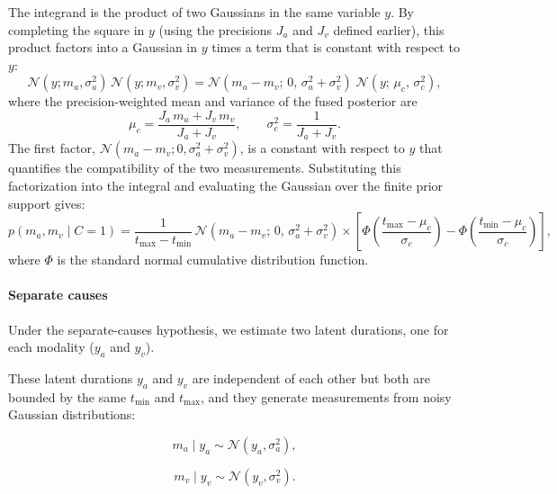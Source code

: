 \documentclass{jov}
\begin{document}
The integrand is the product of two Gaussians in the same variable $y$. By completing the square in $y$ (using the precisions $J_a$ and $J_v$ defined earlier), this product factors into a Gaussian in $y$ times a term that is constant with respect to $y$:
\begin{equation}
\label{eq:product_gaussians_factorization}
\mathcal{N}(y; m_a, \sigma_a^2)\, \mathcal{N}(y; m_v, \sigma_v^2) 
= \mathcal{N}(m_a - m_v;\, 0,\, \sigma_a^2 + \sigma_v^2)\;\mathcal{N}(y;\, \mu_c,\, \sigma_c^2),
\end{equation}
where the precision-weighted mean and variance of the fused posterior are
\begin{equation}
\mu_c = \frac{J_a\, m_a + J_v\, m_v}{J_a + J_v}, 
\qquad
\sigma_c^2 = \frac{1}{J_a + J_v}.
\end{equation}
The first factor, $\mathcal{N}(m_a - m_v; 0, \sigma_a^2 + \sigma_v^2)$, is a constant with respect to $y$ that quantifies the compatibility of the two measurements.  Substituting this factorization into the integral and evaluating the Gaussian over the finite prior support gives:
\begin{equation}
\label{eq:likelihood_c1_final}
p(m_a, m_v \mid C\!=\!1) = \frac{1}{t_{\max} - t_{\min}}\, \mathcal{N}(m_a - m_v;\, 0,\, \sigma_a^2 + \sigma_v^2) 
\times \left[\Phi\!\left(\frac{t_{\max} - \mu_c}{\sigma_c}\right) - \Phi\!\left(\frac{t_{\min} - \mu_c}{\sigma_c}\right)\right],
\end{equation}
where $\Phi$ is the standard normal cumulative distribution function.

\paragraph{Separate causes}

Under the separate-causes hypothesis, we estimate two latent durations, one for each modality ($y_a$ and $y_v$).

These latent durations $y_a$ and $y_v$ are independent of each other but both are bounded by the same $t_{\min}$ and $t_{\max}$, and they generate measurements from noisy Gaussian distributions:

\begin{equation}
m_a \mid y_a \sim \mathcal{N}(y_a, \sigma_a^2),
\end{equation}

\begin{equation}
m_v \mid y_v \sim \mathcal{N}(y_v, \sigma_v^2).
\end{equation}
\end{document}
